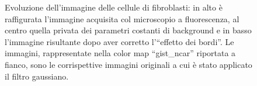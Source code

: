 \begin{figure}
 \caption{\small{Evoluzione dell'immagine delle cellule di fibroblasti: in alto è raffigurata l'immagine acquisita col microscopio a fluorescenza, al centro quella privata dei parametri costanti di background e in basso l'immagine risultante dopo aver corretto l'``effetto dei bordi''. Le immagini, rappresentate nella color map ``gist\_ncar'' riportata a fianco, sono le corrispettive immagini originali a cui è stato applicato il filtro gaussiano.}}
 \label{fig:cmap}
\end{figure}